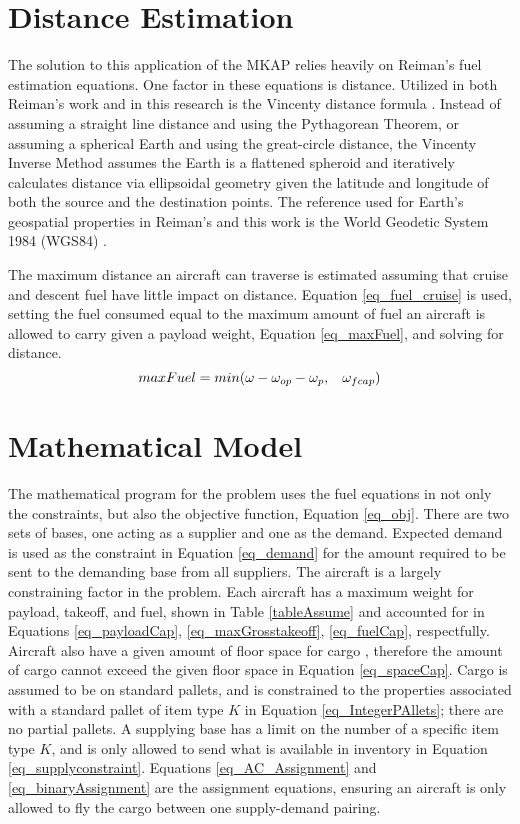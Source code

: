 \section{Distance Estimation}
The solution to this application of the MKAP relies heavily on Reiman's \cite{Reiman2014} fuel estimation equations. One factor in these equations is distance. Utilized in both Reiman's work and in this research is the Vincenty distance formula \cite{Vincenty1975DirectEquations}. Instead of assuming a straight line distance and using the Pythagorean Theorem, or assuming a spherical Earth and using the great-circle distance, the Vincenty Inverse Method assumes the Earth is a flattened spheroid and iteratively calculates distance via ellipsoidal geometry given the latitude and longitude of both the source and the destination points.  The reference used for Earth's geospatial properties in Reiman's and this work is the World Geodetic System 1984 (WGS84) \cite{WGS}.\par
The maximum distance an aircraft can traverse is estimated assuming that cruise and descent fuel have little impact on distance. Equation \ref{eq_fuel_cruise} is used, setting the fuel consumed equal to the maximum amount of fuel an aircraft is allowed to carry given a payload weight, Equation \ref{eq_maxFuel}, and solving for distance.
\begin{equation}
\label{eq_maxFuel}
maxFuel=min(\omega-\omega_{op}-\omega_p, \hspace{3mm} \omega_{fcap}) 
\end{equation}
\newpage
\section{Mathematical Model} \label{sec_mathModel}
The mathematical program for the problem uses the fuel equations in not only the constraints, but also the objective function, Equation \ref{eq_obj}.  There are two sets of bases, one acting as a supplier and one as the demand. Expected demand is used as the constraint in Equation \ref{eq_demand} for the amount required to be sent to the demanding base from all suppliers. The aircraft is a largely constraining factor in the problem. Each aircraft has a maximum weight for payload, takeoff, and fuel, shown in Table \ref{tableAssume} and accounted for in Equations \ref{eq_payloadCap}, \ref{eq_maxGrosstakeoff}, \ref{eq_fuelCap}, respectfully. Aircraft also have a given amount of floor space for cargo \cite{C5}\cite{c-17}\cite{c130}, therefore the amount of cargo cannot exceed the given floor space in Equation \ref{eq_spaceCap}. Cargo is assumed to be on standard pallets, and is constrained to the properties associated with a standard pallet of item type $K$ in Equation \ref{eq_IntegerPAllets}; there are no partial pallets. A supplying base has a limit on the number of a specific item type $K$, and is only allowed to send what is available in inventory in Equation \ref{eq_supplyconstraint}. Equations \ref{eq_AC_Assignment} and \ref{eq_binaryAssignment} are the assignment equations, ensuring an aircraft is only allowed to fly the cargo between one supply-demand pairing.\\  


